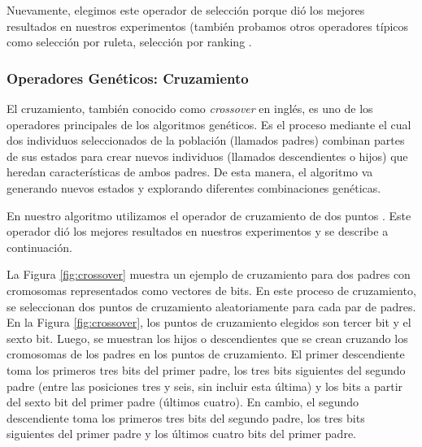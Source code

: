 Nuevamente, elegimos este operador de selección porque dió los mejores resultados en nuestros experimentos (también probamos otros operadores típicos como selección por ruleta, selección por ranking \cite{Goldberg:1989}.


\subsubsection{Operadores Genéticos: Cruzamiento}

El cruzamiento, también conocido como \emph{crossover} en inglés, es uno de los operadores principales de los algoritmos genéticos. Es el proceso mediante el cual dos individuos seleccionados de la población (llamados padres) combinan partes de sus estados para crear nuevos individuos (llamados descendientes o hijos) que heredan características de ambos padres. De esta manera, el algoritmo va generando nuevos estados y explorando diferentes combinaciones genéticas.

En nuestro algoritmo utilizamos el operador de cruzamiento de dos puntos \cite{goldberg1989genetic}. Este operador dió los mejores resultados en nuestros experimentos y se describe a continuación. 

La Figura \ref{fig:crossover} muestra un ejemplo de cruzamiento para dos padres con cromosomas representados como vectores de bits. En este proceso de cruzamiento, se seleccionan dos puntos de cruzamiento aleatoriamente para cada par de padres. En la Figura \ref{fig:crossover}, los puntos de cruzamiento elegidos son  tercer bit y el sexto bit. Luego, se muestran los hijos o descendientes que se crean cruzando los cromosomas de los padres en los puntos de cruzamiento. El primer descendiente toma los primeros tres bits del primer padre, los tres bits siguientes del segundo padre (entre las posiciones tres y seis, sin incluir esta última) y los bits a partir del sexto bit del primer padre (últimos cuatro). En cambio, el segundo descendiente toma los primeros tres bits del segundo padre, los tres bits siguientes del primer padre y los últimos cuatro bits del primer padre.

